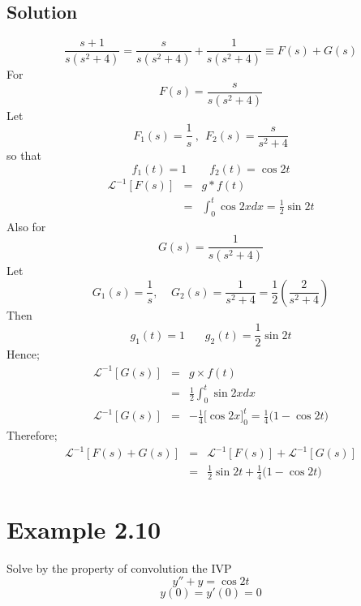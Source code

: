\documentclass[11pt]{report}
\newcommand{\Laplace}{\mathcal{L}}
\newcommand{\ft}{f(t)}
\newcommand{\Fs}{F(s)}
\newcommand{\InverseL}[1]{\Laplace^{-1}\left[#1\right]}
\newcommand{\sps}{\\[0.2cm]}
\newcommand{\sprime}{'}
\newcommand{\dprime}{''}
\begin{document}
	\subsection*{Solution}
	\begin{equation*}
		\frac{s+1}{s(s^2+4)} = \frac{s}{s(s^2+4)} + \frac{1}{s(s^2+4)} \equiv F(s) + G(s)
	\end{equation*}
	For
	\begin{equation*}
		F(s)=\frac{s}{s(s^2+4)}
	\end{equation*}
	Let
	\begin{equation*}
		F_1(s) = \frac{1}{s}~,~~ F_2(s) = \frac{s}{s^2+4}
	\end{equation*}
	so that
	\begin{equation*}
		f_1(t) = 1~~~~~~~~~ f_2(t) = \cos 2t
	\end{equation*}
	\begin{eqnarray*}
		\InverseL{\Fs} &=& g * \ft\sps
		&=&\int_0^t\cos 2x dx = \frac{1}{2}\sin 2t
	\end{eqnarray*}
	Also for
	\begin{equation*}
		G(s) = \frac{1}{s(s^2+4)}
	\end{equation*}
	Let
	\begin{equation*}
		G_1(s) = \frac{1}{s}, ~~~~~ G_2(s) = \frac{1}{s^2+4} = \frac{1}{2}\left(\frac{2}{s^2+4}\right)
	\end{equation*}
	Then
	\begin{equation*}
		g_1(t) = 1 ~~~~~~~~ g_2(t)=\frac{1}{2}\sin 2t
	\end{equation*}
	Hence;
	\begin{eqnarray*}
		\InverseL{G(s)} &=& g \times f(t)\sps
		&=&\frac{1}{2}\int_0^t\sin 2x dx\sps
		\InverseL{G(s)}&=&-\frac{1}{4}\Big[\cos 2x\Big]_0^t = \frac{1}{4}\Big(1-\cos 2t\Big)
	\end{eqnarray*}
	Therefore;
	\begin{eqnarray*}
		\InverseL{F(s) + G(s)} &=& \InverseL{F(s)} + \InverseL{G(s)}\sps
		&=&\frac{1}{2}\sin 2t + \frac{1}{4}\Big(1-\cos 2t\Big)
	\end{eqnarray*}
	
	\section*{Example 2.10}
	Solve by the property of convolution the IVP
	\begin{equation}
		y\dprime + y = \cos 2t \tag{i}\label{eq:2_10_i}
	\end{equation}
	\begin{equation}
		y(0)=y\sprime(0)=0 \tag{ii}\label{eq:2_10_ii}
	\end{equation}
\end{document}
